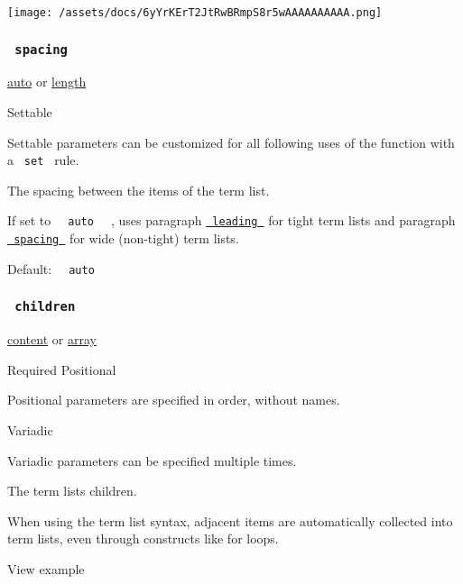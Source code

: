 \texttt{[image: /assets/docs/6yYrKErT2JtRwBRmpS8r5wAAAAAAAAAA.png]}

\subsubsection{\texorpdfstring{\texttt{\ spacing\ }}{ spacing }}\label{parameters-spacing}

\href{/docs/reference/foundations/auto/}{auto} {or}
\href{/docs/reference/layout/length/}{length}

{{ Settable }}

\label{parameters-spacing-settable-tooltip}
Settable parameters can be customized for all following uses of the
function with a \texttt{\ set\ } rule.

The spacing between the items of the term list.

If set to \texttt{\ }{\texttt{\ auto\ }}\texttt{\ } , uses paragraph
\href{/docs/reference/model/par/\#parameters-leading}{\texttt{\ leading\ }}
for tight term lists and paragraph
\href{/docs/reference/model/par/\#parameters-spacing}{\texttt{\ spacing\ }}
for wide (non-tight) term lists.

Default: \texttt{\ }{\texttt{\ auto\ }}\texttt{\ }

\subsubsection{\texorpdfstring{\texttt{\ children\ }}{ children }}\label{parameters-children}

\href{/docs/reference/foundations/content/}{content} {or}
\href{/docs/reference/foundations/array/}{array}

{Required} {{ Positional }}

\label{parameters-children-positional-tooltip}
Positional parameters are specified in order, without names.

{{ Variadic }}

\label{parameters-children-variadic-tooltip}
Variadic parameters can be specified multiple times.

The term list\textquotesingle s children.

When using the term list syntax, adjacent items are automatically
collected into term lists, even through constructs like for loops.


View example

